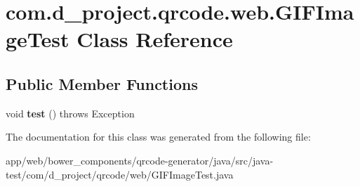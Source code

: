 \hypertarget{classcom_1_1d__project_1_1qrcode_1_1web_1_1_g_i_f_image_test}{}\section{com.\+d\+\_\+project.\+qrcode.\+web.\+G\+I\+F\+Image\+Test Class Reference}
\label{classcom_1_1d__project_1_1qrcode_1_1web_1_1_g_i_f_image_test}
\subsection*{Public Member Functions}
\begin{DoxyCompactItemize}
\item 
\mbox{\label{classcom_1_1d__project_1_1qrcode_1_1web_1_1_g_i_f_image_test_a4b19153a4f60663417da129261ce768a}} 
void {\bfseries test} ()  throws Exception 
\end{DoxyCompactItemize}


The documentation for this class was generated from the following file\+:\begin{DoxyCompactItemize}
\item 
app/web/bower\+\_\+components/qrcode-\/generator/java/src/java-\/test/com/d\+\_\+project/qrcode/web/G\+I\+F\+Image\+Test.\+java\end{DoxyCompactItemize}
